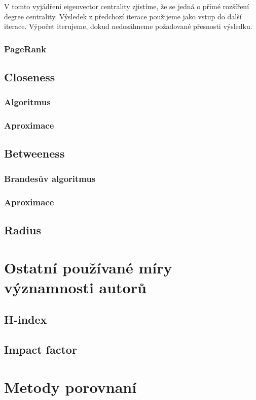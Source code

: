 \documentclass[12pt,titlepage]{report}
\begin{document}
V tomto vyjádření eigenvector centrality zjistíme, že se jedná o přímé
rozšíření degree centrality. Výsledek z předchozí iterace použijeme jako vstup
do další iterace. Výpočet iterujeme, dokud nedosáhneme požadované přesnosti
výsledku.
\subsubsection{PageRank}
\subsection{Closeness}
\subsubsection{Algoritmus}
\subsubsection{Aproximace}
\subsection{Betweeness}
\subsubsection{Brandesův algoritmus}
\subsubsection{Aproximace}
\subsection{Radius}

\section{Ostatní používané míry významnosti autorů}
\subsection{H-index}
\subsection{Impact factor}

\section{Metody porovnaní}
\end{document}
